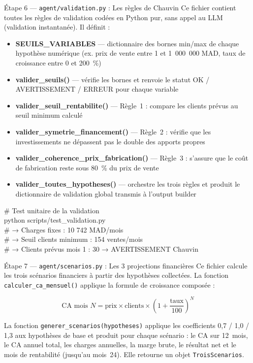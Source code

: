 \documentclass[12pt, a4paper]{report}
\begin{document}
\bigskip

\begin{stepbox}{Étape 6 — \texttt{agent/validation.py} : Les règles de Chauvin}
Ce fichier contient toutes les règles de validation codées en Python pur, sans appel au LLM (validation instantanée). Il définit :

\begin{itemize}
  \item \textbf{SEUILS\_VARIABLES} — dictionnaire des bornes min/max de chaque hypothèse numérique (ex. prix de vente entre 1 et 1~000~000 MAD, taux de croissance entre 0 et 200~\%)
  \item \textbf{valider\_seuils()} — vérifie les bornes et renvoie le statut OK / AVERTISSEMENT / ERREUR pour chaque variable
  \item \textbf{valider\_seuil\_rentabilite()} — Règle~1 : compare les clients prévus au seuil minimum calculé
  \item \textbf{valider\_symetrie\_financement()} — Règle~2 : vérifie que les investissements ne dépassent pas le double des apports propres
  \item \textbf{valider\_coherence\_prix\_fabrication()} — Règle~3 : s'assure que le coût de fabrication reste sous 80~\% du prix de vente
  \item \textbf{valider\_toutes\_hypotheses()} — orchestre les trois règles et produit le dictionnaire de validation global transmis à l'output builder
\end{itemize}

\begin{codebox}
\# Test unitaire de la validation\\
python scripts/test\_validation.py\\
\# → Charges fixes : 10 742 MAD/mois\\
\# → Seuil clients minimum : 154 ventes/mois\\
\# → Clients prévus mois 1 : 30 → AVERTISSEMENT Chauvin
\end{codebox}
\end{stepbox}

\bigskip

\begin{stepbox}{Étape 7 — \texttt{agent/scenarios.py} : Les 3 projections financières}
Ce fichier calcule les trois scénarios financiers à partir des hypothèses collectées. La fonction \texttt{calculer\_ca\_mensuel()} applique la formule de croissance composée :

$$\text{CA mois } N = \text{prix} \times \text{clients} \times \left(1 + \frac{\text{taux}}{100}\right)^N$$

La fonction \texttt{generer\_scenarios(hypotheses)} applique les coefficients 0{,}7 / 1{,}0 / 1{,}3 aux hypothèses de base et produit pour chaque scénario : le CA sur 12~mois, le CA annuel total, les charges annuelles, la marge brute, le résultat net et le mois de rentabilité (jusqu'au mois~24). Elle retourne un objet \texttt{TroisScenarios}.
\end{stepbox}
\end{document}

